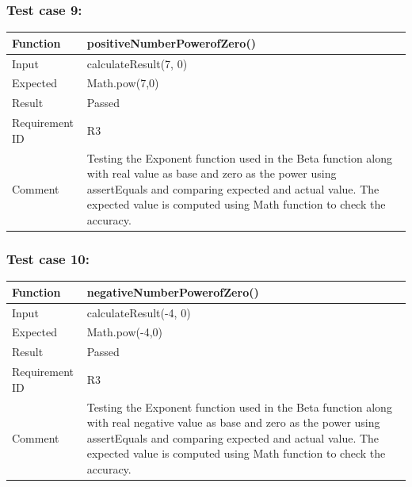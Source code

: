 \documentclass[letterpaper, 11pt]{article}
\begin{document}
        \subsubsection{\textbf{Test case 9:}} 
            \setlength{\tabcolsep}{25pt}
            \renewcommand{\arraystretch}{1.5}
            \begin{tabularx}{1.0\textwidth} { 
                  | >{\raggedright\arraybackslash}X 
                  | >{\raggedright\arraybackslash}X | }
                 \hline
                 Function & positiveNumberPowerofZero()\\
                 \hline
                 Input  & calculateResult(7, 0)\\
                  \hline
                 Expected  & Math.pow(7,0)\\
                  \hline
                 Result  & Passed\\
                  \hline
                 Requirement ID  & R3\\
                    \hline
                 Comment  & Testing the Exponent function used in the Beta function along with real value as base and zero as the power using assertEquals and comparing expected and actual value. The expected value is computed using Math function to check the accuracy.\\
                \hline
            \end{tabularx} 
        \subsubsection{\textbf{Test case 10:}} 
            \setlength{\tabcolsep}{25pt}
            \renewcommand{\arraystretch}{1.5}
            \begin{tabularx}{1.0\textwidth} { 
                  | >{\raggedright\arraybackslash}X 
                  | >{\raggedright\arraybackslash}X | }
                 \hline
                 Function & negativeNumberPowerofZero()\\
                 \hline
                 Input  & calculateResult(-4, 0)\\
                  \hline
                 Expected  & Math.pow(-4,0)\\
                  \hline
                 Result  & Passed\\
                  \hline
                 Requirement ID  & R3\\
                    \hline
                 Comment  & Testing the Exponent function used in the Beta function along with real negative value as base and zero as the power using assertEquals and comparing expected and actual value. The expected value is computed using Math function to check the accuracy.\\
                \hline
            \end{tabularx} 
\end{document}
